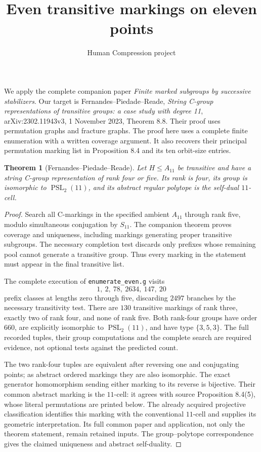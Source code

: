\documentclass[11pt,a4paper]{article}
\title{Even transitive markings on eleven points}
\author{Human Compression project}\date{}
\newtheorem{theorem}{Theorem}\newtheorem{proposition}[theorem]{Proposition}
\begin{document}
\maketitle
We apply the complete companion paper \emph{Finite marked subgroups
by successive stabilizers}. Our target is Fernandes--Piedade--Reade,
\emph{String C-group representations of transitive groups: a case
study with degree 11}, arXiv:2302.11943v3, 1 November 2023, Theorem
8.8. Their proof uses permutation graphs and fracture graphs.
The proof here uses a complete finite enumeration with a written
coverage argument. It also recovers their principal permutation
marking list in Proposition 8.4 and its ten orbit-size entries.

\begin{theorem}[Fernandes--Piedade--Reade]\label{main}
Let $H\le A_{11}$ be transitive and have a string C-group
representation of rank four or five. Its rank is four, its
group is isomorphic to $\operatorname{PSL}_2(11)$, and its
abstract regular polytope is the self-dual $11$-cell.
\end{theorem}
\begin{proof}
Search all C-markings in the specified ambient $A_{11}$ through
rank five, modulo simultaneous conjugation by $S_{11}$. The
companion theorem proves coverage and uniqueness, including
markings generating proper transitive subgroups. The necessary
completion test discards only prefixes whose remaining pool
cannot generate a transitive group. Thus every marking in the
statement must appear in the final transitive list.

The complete execution of \texttt{enumerate\_even.g} visits
\[
  1,\ 2,\ 78,\ 2634,\ 147,\ 20
\]
prefix classes at lengths zero through five, discarding $2497$
branches by the necessary transitivity test. There are $130$
transitive markings of rank three, exactly two of rank four,
and none of rank five. Both rank-four groups have order $660$,
are explicitly isomorphic to $\operatorname{PSL}_2(11)$, and
have type $\{3,5,3\}$. The full recorded tuples, their group
computations and the complete search are required evidence,
not optional tests against the predicted count.

The two rank-four tuples are equivalent after reversing one
and conjugating points; as abstract ordered markings they are
also isomorphic. The exact generator homomorphism sending either
marking to its reverse is bijective. Their common abstract
marking is the $11$-cell: it agrees with source Proposition
8.4(5), whose literal permutations are printed below. The
already acquired projective classification identifies this
marking with the conventional $11$-cell and supplies its
geometric interpretation. Its full common paper and application,
not only the theorem statement, remain retained inputs. The
group--polytope correspondence gives the claimed uniqueness
and abstract self-duality.
\end{proof}
\end{document}
